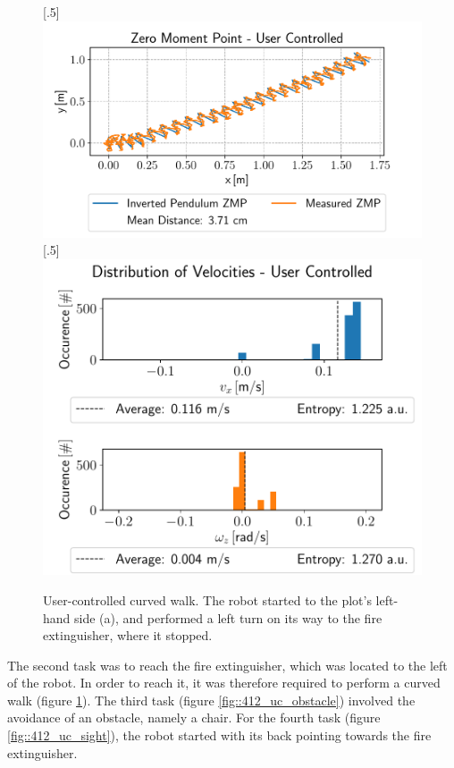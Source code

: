 \begin{figure}[h!]
	[.5\linewidth]{\includegraphics[scale=.45]{chapters/06_walking_experiments/01_user_controlled_walking/02_test_environment/curved_walk_01_zmp.pdf}}
	[.5\linewidth]{\includegraphics[scale=.45]{chapters/06_walking_experiments/01_user_controlled_walking/02_test_environment/curved_walk_01_entropy.pdf}}
	\caption{User-controlled curved walk. The robot started to the plot's left-hand side (a), and performed a left turn on its way to the fire extinguisher, where it stopped.}
	\label{fig::412_uc_curved}
\end{figure} 
The second task was to reach the fire extinguisher, which was located to the left of the robot. In order to reach it, it was therefore required to perform a curved walk (figure \ref{fig::412_uc_curved}). The third task (figure \ref{fig::412_uc_obstacle}) involved the avoidance of an obstacle, namely a chair. For the fourth task (figure \ref{fig::412_uc_sight}), the robot started with its back pointing towards the fire extinguisher.
